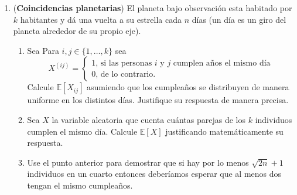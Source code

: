 \documentclass[12pt, a4paper]{article}
\newcommand{\EE}{\mathbb{E}}
\begin{document}
\begin{enumerate}
\item ({\bf Coincidencias planetarias}) El planeta bajo observación esta habitado por $k$ habitantes y dá una vuelta a su estrella cada $n$ días (un día es un giro del planeta alrededor de su propio eje).
\begin{enumerate}
\item Sea Para $i,j\in \{1,\dots, k\}$ sea 
\[X^{(ij)}=\begin{cases}
1\text{, si las personas $i$ y $j$ cumplen años el mismo día}\\
0\text{, de lo contrario.}
\end{cases}
\]
Calcule $\EE[X_{ij}]$ asumiendo que los cumpleaños se distribuyen de manera uniforme en los distintos días. Justifique su respuesta de manera precisa.
\item Sea $X$ la variable aleatoria que cuenta cuántas parejas de los $k$ individuos cumplen el mismo día. Calcule $\EE[X]$ justificando matemáticamente su respuesta.
\item Use el punto anterior para demostrar que si hay por lo menos $\sqrt{2n}+1$ individuos en un cuarto entonces deberíamos esperar que al menos dos tengan el mismo cumpleaños.
\end{enumerate}

\end{enumerate}
\end{document}
